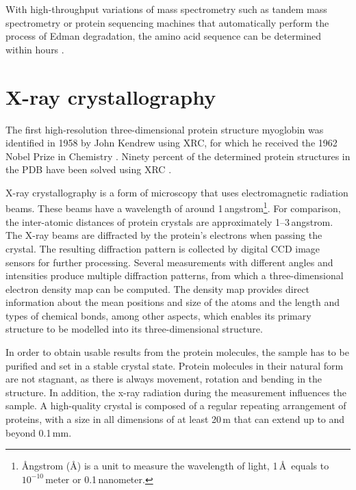 With high-throughput variations of mass spectrometry such as tandem mass spectrometry or protein sequencing machines that automatically perform the process of Edman degradation, the amino acid sequence can be determined within hours \cite{Nelson.2013}.
 

\section{X-ray crystallography}

The first high-resolution three-dimensional protein structure myoglobin was identified in 1958 by
John Kendrew using \acf{XRC}, for which he received the 1962 Nobel Prize in Chemistry \cite{kendrew1958three}. Ninety percent of the determined protein structures in the PDB have been solved using \ac{XRC} \cite{Burley.2018}.  

X-ray crystallography is a form of microscopy that uses electromagnetic radiation beams.  
These beams have a wavelength of around 1\,\ac{angstrom}\footnote{\AA ngstrom (\AA) is a unit to measure the wavelength of light, 1\,\AA \, equals to $10^{-10}$\,meter or 0.1\,nanometer.}. For comparison, the inter-atomic distances of protein crystals are approximately  1--3\,\ac{angstrom}. 
The X-ray beams are diffracted by the protein's electrons when passing the crystal. The resulting diffraction pattern is collected by digital \ac{CCD} image sensors for further processing. 
Several measurements with different angles and intensities produce multiple diffraction patterns, from which a three-dimensional electron density map can be computed. The density map provides direct information about the mean positions and size of the atoms and the length and types of chemical bonds, among other aspects, which enables its primary structure to be modelled into its three-dimensional structure.

In order to obtain usable results from the protein molecules, the sample has to be purified and set in a stable crystal state. Protein molecules in their natural form are not stagnant, as there is always movement, rotation and bending in the structure. In addition, the x-ray radiation during the measurement influences the sample. A \mbox{high-quality} crystal is composed of a regular repeating arrangement of proteins, with a size in all dimensions of at least 20\,\textmu m that can extend up to and beyond 0.1\,mm. 



